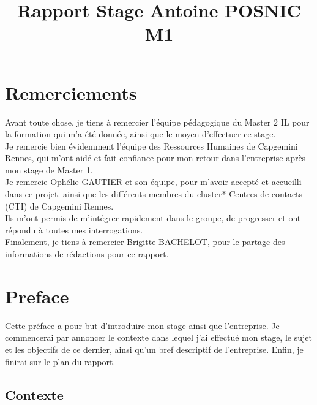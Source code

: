 \documentclass{rapport}
\title{Rapport Stage Antoine POSNIC M1} %
\begin{document}






\fairemarges %
\fairepagedegarde %
\afterpage{\null\newpage}
\tabledematieres %

\section*{Remerciements}
Avant toute chose, je tiens à remercier l'équipe pédagogique du Master 2 IL pour la formation qui m'a été donnée, ainsi que le moyen d'effectuer ce stage.\\
Je remercie bien évidemment l'équipe des Ressources Humaines de Capgemini Rennes, qui m'ont aidé et fait confiance pour mon retour dans l'entreprise après mon stage de Master 1.\\
Je remercie Ophélie GAUTIER et son équipe, pour m'avoir accepté et accueilli dans ce projet. ainsi que les différents membres du cluster* Centres de contacts (CTI) de Capgemini Rennes.\\
Ils m'ont permis de m'intégrer rapidement dans le groupe, de progresser et ont répondu à toutes mes interrogations.\\
Finalement, je tiens à remercier Brigitte BACHELOT, pour le partage des informations de rédactions pour ce rapport.
\newpage
\section*{Preface}
Cette préface a pour but d'introduire mon stage ainsi que l'entreprise. Je commencerai par annoncer le contexte dans lequel j'ai effectué mon stage, le sujet et les objectifs de ce dernier, ainsi qu'un bref descriptif de l'entreprise. Enfin, je finirai sur le plan du rapport.

\subsection*{Contexte}
\end{document}
